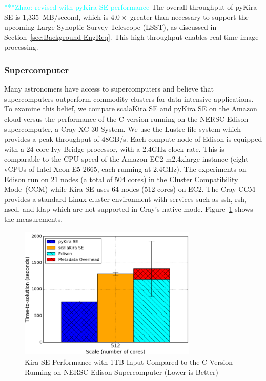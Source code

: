\documentclass[10pt,journal,compsoc]{IEEEtran}
\newcommand{\zhaonote}[1]{{\textcolor{cyan}    { ***Zhao:      #1 }}}
\newcommand{\zhaonote}[1]{}
\begin{document}
\zhaonote{revised with pyKira SE performance}
The overall throughput of pyKira SE is 1,335~MB/second, which is $4.0\times$ greater than necessary
to support the upcoming Large Synoptic Survey Telescope (LSST), as discussed in
Section~\ref{sec:Background-EngReq}. This high throughput enables real-time image processing.


\subsubsection{Supercomputer}

Many astronomers have access to supercomputers and believe that
supercomputers outperform commodity clusters for data-intensive applications.
To examine this belief, we compare scalaKira SE and pyKira SE on the Amazon cloud versus the performance of
the C version running on the NERSC Edison supercomputer, a Cray XC 30 System. We use
the Lustre file system which provides a peak throughput of 48GB/s. Each compute
node of Edison is equipped with a 24-core Ivy Bridge processor, with a 2.4GHz clock rate.
This is comparable to the CPU speed of the Amazon EC2 m2.4xlarge instance (eight vCPUs of
Intel Xeon E5-2665, each running at 2.4GHz). The experiments on Edison run on 21
nodes (a total of 504 cores) in the Cluster Compatibility Mode~(CCM)
while Kira SE uses 64 nodes (512 cores) on EC2. The Cray CCM provides a 
standard Linux cluster environment with services such as ssh, rsh, nscd, and ldap which 
are not supported in Cray's native mode.
Figure~\ref{fig:1tb-edison} shows the measurements.

\begin{figure}[h]
	\begin{center}
		\includegraphics[width=85mm]{pictures/1TB-edison}
		\caption{Kira SE Performance with 1TB Input Compared to the C Version Running on NERSC Edison Supercomputer (Lower is Better)
		\label{fig:1tb-edison}}
  	\end{center}
\end{figure}
\end{document}
